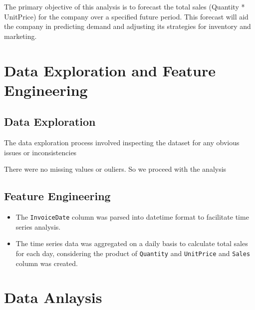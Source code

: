 \documentclass[
  a4paper,
  DIV=11,
  numbers=noendperiod]{scrartcl}
\begin{document}
The primary objective of this analysis is to forecast the total sales
(Quantity * UnitPrice) for the company over a specified future period.
This forecast will aid the company in predicting demand and adjusting
its strategies for inventory and marketing.

\section{Data Exploration and Feature
Engineering}\label{data-exploration-and-feature-engineering}

\subsection{Data Exploration}\label{data-exploration}

The data exploration process involved inspecting the dataset for any
obvious issues or inconsistencies

There were no missing values or ouliers. So we proceed with the analysis

\subsection{Feature Engineering}\label{feature-engineering}

\begin{itemize}
\item
  The \texttt{InvoiceDate} column was parsed into datetime format to
  facilitate time series analysis.
\item
  The time series data was aggregated on a daily basis to calculate
  total sales for each day, considering the product of \texttt{Quantity}
  and \texttt{UnitPrice} and \texttt{Sales} column was created.
\end{itemize}

\section{Data Anlaysis}\label{data-anlaysis}
\end{document}

